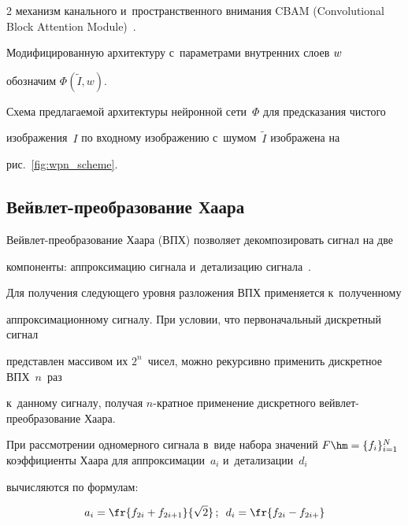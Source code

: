 \begin{multicols}{2}
механизм канального и~пространственного внимания CBAM (Convolutional Block Attention Module)~\cite{CBAMCB}.  


Модифицированную архитектуру с~параметрами внутренних слоев $\mathnormal{w}$ 


обозначим $\Phi(\tilde{I}, {w})$.





Схема предлагаемой архитектуры нейронной сети~$\Phi$ для предсказания чистого 


изображения~$I$ по входному изображению с~шумом~$\tilde{I}$ изображена на 


рис.~\ref{fig:wpn_scheme}.











\subsection{Вейвлет-преобразование Хаара}





Вейвлет-преобразование Хаара (ВПХ) позволяет декомпозировать сигнал на две 


компоненты: аппроксимацию сигнала и~детализацию сигнала~\cite{WAVELETS_PAPER}. 


Для получения следующего уровня разложения ВПХ применяется к~полученному 


аппроксимационному сигналу. При условии, что первоначальный дискретный сигнал 


представлен массивом их $2^n$~чисел, можно рекурсивно применить дискретное ВПХ~$n$~раз 


к~данному сигналу, получая $n$-крат\-ное применение дискретного вейв\-лет-пре\-обра\-зо\-ва\-ние Хаара.





При рассмотрении одномерного сигнала в~виде набора значений $F \hm= \{ f_i \}_{i = 1}^{N}$ коэффициенты Хаара для аппроксимации~$a_{i}$ и~детализации~$d_{i}$ 


вычисляются по формулам:


\begin{equation*}


\label{eq:raw_haar}


a_{i} = \fr{f_{2i} + f_{2i + 1}}{\sqrt{2}}\,;\enskip d_{i} = \fr{f_{2i} - f_{2i + 


}}
\end{equation*}
\end{multicols}
